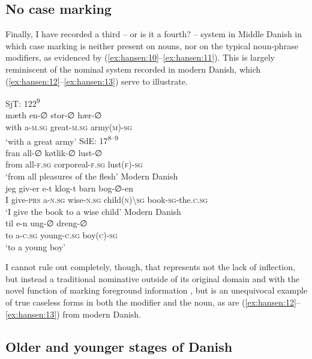 \documentclass[output=paper]{langsci/langscibook}
\begin{document}
\subsection{No case marking} \label{hansen:2.4}

Finally, I have recorded a third – or is it a fourth? – system in Middle Danish in which case marking is neither present on nouns, nor on the typical noun-phrase modifiers, as evidenced by (\ref{ex:hansen:10}--\ref{ex:hansen:11}). This is largely reminiscent of the nominal system recorded in modern Danish, which (\ref{ex:hansen:12}--\ref{ex:hansen:13}) serve to illustrate.

\ea \label{ex:hansen:10}
{SjT: 122\textsuperscript{9}} \\ 
\gll mæth en-∅ stor-∅ hær-∅\\
     with a\textsc{{}-}\textsc{m.sg} great\textsc{{}-}\textsc{m.sg} army\textsc{(m)-sg}\\
\glt ‘with a great army’
\ex \label{ex:hansen:11}
{SdE: 17\textsuperscript{8–9}} \\ 
\gll fran all-∅ køtlik-∅ lust-∅\\
     from all\textsc{{}-}\textsc{f.sg} corporeal\textsc{{}-f.sg} lust\textsc{(f)-sg}\\
\glt ‘from all pleasures of the flesh’
\ex \label{ex:hansen:12}
{Modern Danish} \\ 
\gll jeg giv-er e-t klog-t barn bog-∅-en\\
     I give-\textsc{prs} a{}-\textsc{n.sg} wise\textsc{{}-n.sg} child\textsc{(n){\textbackslash}sg} book-\textsc{sg-}the\textsc{.c.sg}\\
\glt ‘I give the book to a wise child’
\ex \label{ex:hansen:13}
{Modern Danish} \\ 
\gll til e-n ung-∅ dreng-∅\\
     to a-\textsc{c.sg} young\textsc{{}-c.sg} boy\textsc{(c)-sg}\\
\glt ‘to a young boy’
\z

I cannot rule out completely, though, that  represents not the lack of inflection, but instead a traditional nominative outside of its original domain and with the novel function of marking foreground information \citep[264]{Jensen2011}, but  is an unequivocal example of true caseless forms in both the modifier and the noun, as are (\ref{ex:hansen:12}--\ref{ex:hansen:13}) from modern Danish.

\subsection{Older and younger stages of Danish} \label{hansen:2.5}
\end{document}
